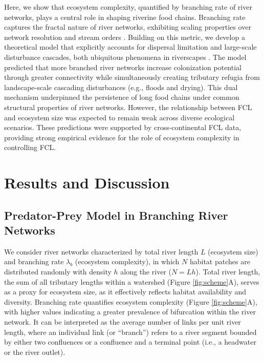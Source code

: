 \documentclass[9pt,twocolumn,twoside]{pnas-new}
\begin{document}
Here, we show that ecosystem complexity, quantified by branching rate of river networks, plays a central role in shaping riverine food chains.
Branching rate captures the fractal nature of river networks, exhibiting scaling properties over network resolution \citep{terui_revisiting_2024} and stream orders \citep{peckham_reformulation_1999, rodriguez-iturbe_fractal_2001, kovchegov_random_2022}.
Building on this metric, we develop a theoretical model that explicitly accounts for dispersal limitation and large-scale disturbance cascades, both ubiquitous phenomena in riverscapes \citep{radinger_patterns_2014, massoudieh_biogeochemical_2010, stanley_ecosystem_1997, swanson_flood_1998, nakamura_disturbance_2000, gomi_understanding_2002, messager_global_2021}.
The model predicted that more branched river networks increase colonization potential through greater connectivity while simultaneously creating tributary refugia from landscape-scale cascading disturbances (e.g., floods and drying).
This dual mechanism underpinned the persistence of long food chains under common structural properties of river networks.
However, the relationship between FCL and ecosystem size was expected to remain weak across diverse ecological scenarios.
These predictions were supported by cross-continental FCL data, providing strong empirical evidence for the role of ecosystem complexity in controlling FCL.

\section{Results and Discussion}

\subsection{Predator-Prey Model in Branching River Networks}

We consider river networks characterized by total river length $L$ (ecosystem size) and branching rate $\lambda_b$ (ecosystem complexity), in which $N$ habitat patches are distributed randomly with density $h$ along the river ($N = Lh$).
Total river length, the sum of all tributary lengths within a watershed (Figure \ref{fig:scheme}A), serves as a proxy for ecosystem size, as it effectively reflects habitat availability and diversity.
Branching rate quantifies ecosystem complexity (Figure \ref{fig:scheme}A), with higher values indicating a greater prevalence of bifurcation within the river network.
It can be interpreted as the average number of links per unit river length, where an individual link (or ``branch'') refers to a river segment bounded by either two confluences or a confluence and a terminal point (i.e., a headwater or the river outlet).
\end{document}
